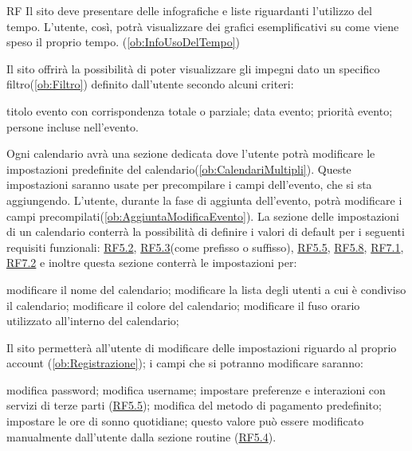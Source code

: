 \begin{listaPersonale}{RF}
	 Il sito deve presentare delle infografiche e liste riguardanti l'utilizzo del tempo. L'utente, così, potrà visualizzare dei grafici esemplificativi su come viene speso il proprio tempo. (\ref{ob:InfoUsoDelTempo})

	 Il sito offrirà la possibilità di poter visualizzare gli impegni dato un specifico filtro(\ref{ob:Filtro}) definito dall'utente secondo alcuni criteri:
	\begin{listaPersonale2}{}
		 titolo evento con corrispondenza totale o parziale;
		 data evento;
		 priorità evento;
		 persone incluse nell'evento.
	\end{listaPersonale2}

 Ogni calendario avrà una sezione dedicata dove l'utente potrà modificare le impostazioni predefinite del calendario(\ref{ob:CalendariMultipli}). Queste impostazioni saranno usate per precompilare i campi dell'evento, che si sta aggiungendo. L'utente, durante la fase di aggiunta dell'evento, potrà modificare i campi precompilati(\ref{ob:AggiuntaModificaEvento}). La sezione delle impostazioni di un calendario conterrà la possibilità di definire i valori di default per i seguenti requisiti funzionali: \hyperref[rf:PrioritaEvento]{RF5.2}, \hyperref[rf:DescrizioneTitoloEvento]{RF5.3}(come prefisso o suffisso), \hyperref[rf:LuogoEvento]{RF5.5}, \hyperref[rf:DifficoltaEvento]{RF5.8}, \hyperref[rf:ImpostazioneTimerNotifiche]{RF7.1}, \hyperref[rf:TitoloNotifiche]{RF7.2} e inoltre questa sezione conterrà le impostazioni per:
	\begin{listaPersonale2}{}
		 modificare il nome del calendario;
		 modificare la lista degli utenti a cui è condiviso il calendario;
		 modificare il colore del calendario;
		 modificare il fuso orario utilizzato all'interno del calendario;

	\end{listaPersonale2}

	 Il sito permetterà all'utente di modificare delle impostazioni riguardo al proprio account (\ref{ob:Registrazione}); i campi che si potranno modificare saranno:
	\begin{listaPersonale2}{}
		 modifica password;
		 modifica username;
 impostare preferenze e interazioni con servizi di terze parti (\hyperref[rf:LuogoEvento]{RF5.5});
		 modifica del metodo di pagamento predefinito;
		 impostare le ore di sonno quotidiane; questo valore può essere modificato manualmente dall'utente dalla sezione routine (\hyperref[rf:RoutineEvento]{RF5.4}).
	\end{listaPersonale2}


\end{listaPersonale}
